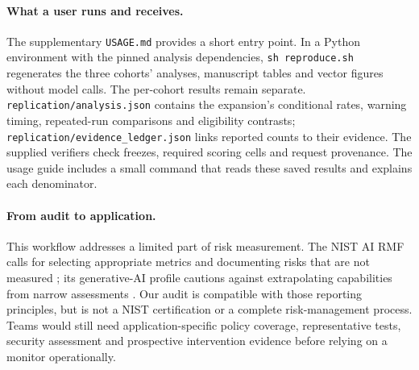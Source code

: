 \paragraph{What a user runs and receives.}
The supplementary \texttt{USAGE.md} provides a short entry point. In a Python environment with the pinned analysis dependencies, \texttt{sh reproduce.sh} regenerates the three cohorts' analyses, manuscript tables and vector figures without model calls. The per-cohort results remain separate. \texttt{replication/analysis.json} contains the expansion's conditional rates, warning timing, repeated-run comparisons and eligibility contrasts; \texttt{replication/evidence\_ledger.json} links reported counts to their evidence. The supplied verifiers check freezes, required scoring cells and request provenance. The usage guide includes a small command that reads these saved results and explains each denominator.

\paragraph{From audit to application.}
This workflow addresses a limited part of risk measurement. The NIST AI RMF calls for selecting appropriate metrics and documenting risks that are not measured \citep{nist2023rmf}; its generative-AI profile cautions against extrapolating capabilities from narrow assessments \citep{nist2024genai}. Our audit is compatible with those reporting principles, but is not a NIST certification or a complete risk-management process. Teams would still need application-specific policy coverage, representative tests, security assessment and prospective intervention evidence before relying on a monitor operationally.
